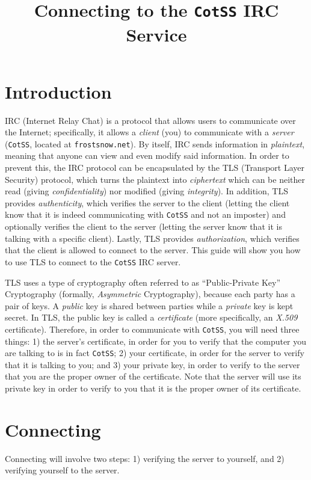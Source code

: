 \documentclass{article}
\begin{document}
\title{Connecting to the \texttt{CotSS} IRC Service}

\maketitle

\section{Introduction}
IRC (Internet Relay Chat) is a protocol that allows users to communicate over the Internet; specifically, it allows a \textit{client} (you) to communicate with a \textit{server} (\texttt{CotSS}, located at \texttt{frostsnow.net}).  By itself, IRC sends information in \textit{plaintext}, meaning that anyone can view and even modify said information.  In order to prevent this, the IRC protocol can be encapsulated by the TLS (Transport Layer Security) protocol, which turns the plaintext into \textit{ciphertext} which can be neither read (giving \textit{confidentiality}) nor modified (giving \textit{integrity}).  In addition, TLS provides \textit{authenticity}, which verifies the server to the client (letting the client know that it is indeed communicating with \texttt{CotSS} and not an imposter) and optionally verifies the client to the server (letting the server know that it is talking with a specific client).  Lastly, TLS provides \textit{authorization}, which verifies that the client is allowed to connect to the server.  This guide will show you how to use TLS to connect to the \texttt{CotSS} IRC server.

TLS uses a type of cryptography often referred to as ``Public-Private Key'' Cryptography (formally, \textit{Asymmetric} Cryptography), because each party has a pair of keys.  A \textit{public} key is shared between parties while a \textit{private} key is kept secret.  In TLS, the public key is called a \textit{certificate} (more specifically, an \textit{X.509} certificate).  Therefore, in order to communicate with \texttt{CotSS}, you will need three things: 1) the server's certificate, in order for you to verify that the computer you are talking to is in fact \texttt{CotSS}; 2) your certificate, in order for the server to verify that it is talking to you; and 3) your private key, in order to verify to the server that you are the proper owner of the certificate.  Note that the server will use its private key in order to verify to you that it is the proper owner of its certificate.

\section{Connecting}
Connecting will involve two steps: 1) verifying the server to yourself, and 2) verifying yourself to the server.
\end{document}
